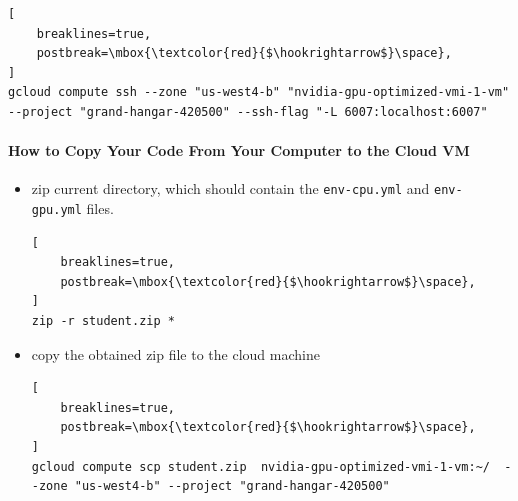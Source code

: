 \begin{lstlisting}[
    breaklines=true,
    postbreak=\mbox{\textcolor{red}{$\hookrightarrow$}\space},
]
gcloud compute ssh --zone "us-west4-b" "nvidia-gpu-optimized-vmi-1-vm" --project "grand-hangar-420500" --ssh-flag "-L 6007:localhost:6007"
\end{lstlisting}



\paragraph{How to Copy Your Code From Your Computer to the Cloud VM}
\begin{itemize}
    \item zip current directory, which should contain the \texttt{env-cpu.yml} and \texttt{env-gpu.yml} files.
\begin{lstlisting}[
    breaklines=true,
    postbreak=\mbox{\textcolor{red}{$\hookrightarrow$}\space},
]
zip -r student.zip *
\end{lstlisting}
    
    \item copy the obtained zip file to the cloud machine
\begin{lstlisting}[
    breaklines=true,
    postbreak=\mbox{\textcolor{red}{$\hookrightarrow$}\space},
]
gcloud compute scp student.zip  nvidia-gpu-optimized-vmi-1-vm:~/  --zone "us-west4-b" --project "grand-hangar-420500" 
\end{lstlisting}

\end{itemize}



